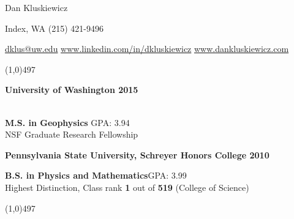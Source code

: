 \documentclass[10pt]{article} %
\begin{document}

\centerline{{\Huge \sc Dan Kluskiewicz}}  %
\centerline{Index, WA \textbullet \hspace{5pt} (215) 421-9496}
\centerline{\href{mailto:dklus@uw.edu}{dklus@uw.edu} 
\textbullet \hspace{5pt}  \url{www.linkedin.com/in/dkluskiewicz}
\textbullet \hspace{5pt}  \url{www.dankluskiewicz.com}
}

\noindent

\vspace{-2mm}
\noindent
\line(1,0){497}\\
\vspace{-3.5mm}

\begin{tcolorbox}
\noindent \centerline{\large \bf University of Washington \hfill 2015} \\
\textbf{M.S. in Geophysics} \hfill GPA: 3.94 \\
{\normalsize \hfill NSF Graduate Research Fellowship}
\end{tcolorbox}
\vspace{-1.5mm}

\vspace{-1mm}
\begin{tcolorbox}
\noindent \centerline{\large \bf Pennsylvania State University, Schreyer Honors College \hfill 2010}
\textbf{B.S. in Physics and Mathematics}\hfill GPA: 3.99\\
{\normalsize \hfill Highest Distinction, Class rank \textbf{1} out of \textbf{519} (College of Science)}
\end{tcolorbox}
\vspace{-1.5mm}


\vspace{-2.5mm}
\noindent
\line(1,0){497}\\
\vspace{-3.5mm}


\noindent
\end{document}
